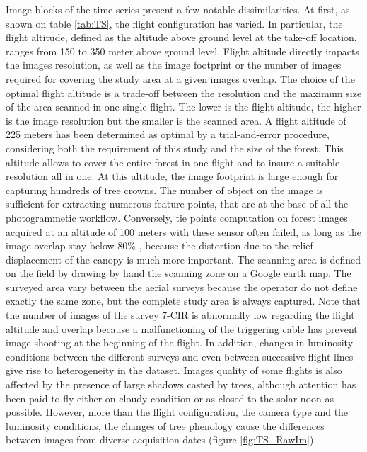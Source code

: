 \documentclass[remotesensing,article,submit,moreauthors,pdftex,12pt,a4paper]{mdpi} %
\begin{document}
Image blocks of the time series present a few notable dissimilarities. 
At first, as shown on table \ref{tab:TS}, the flight configuration has varied. 
In particular, the flight altitude, defined as the altitude above ground level at the take-off location, ranges from 150 to 350 meter above ground level. 
Flight altitude directly impacts the images resolution, as well as the image footprint or the number of images required for covering the study area at a given images overlap. 
The choice of the optimal flight altitude is a trade-off between the resolution and the maximum size of the area scanned in one single flight. 
The lower is the flight altitude, the higher is the image resolution but the smaller is the scanned area.
A flight altitude of 225 meters has been determined as optimal by a trial-and-error procedure, considering both the requirement of this study and the size of the forest.
This altitude allows to cover the entire forest in one flight and to insure a suitable resolution all in one.
At this altitude, the image footprint is large enough for capturing hundreds of tree crowns. 
The number of object on the image is sufficient for extracting numerous feature points, that are at the base of all the photogrammetic workflow. 
Conversely, tie points computation on forest images acquired at an altitude of 100 meters with these sensor often failed, as long as the image overlap stay below 80\% , because the distortion due to the relief displacement of the canopy is much more important. 
The scanning area is defined on the field by drawing by hand the scanning zone on a Google earth map. 
The surveyed area vary between the aerial surveys because the operator do not define exactly the same zone, but the complete study area is always captured. 
Note that the number of images of the survey 7-CIR is abnormally low regarding the flight altitude and overlap because a malfunctioning of the triggering cable has prevent image shooting at the beginning of the flight. 
In addition, changes in luminosity conditions between the different surveys and even between successive flight lines give rise to heterogeneity in the dataset. 
Images quality of some flights is also affected by the presence of large shadows casted by trees, although attention has been paid to fly either on cloudy condition or as closed to the solar noon as possible. 
However, more than the flight configuration, the camera type and the luminosity conditions, the changes of tree phenology cause the differences between images from diverse acquisition dates (figure \ref{fig:TS_RawIm}).
\end{document}
